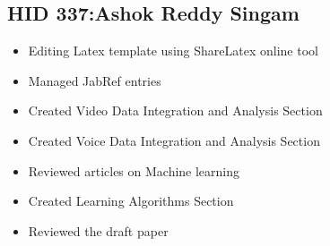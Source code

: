 \documentclass[sigconf]{acmart}
\begin{document}
\subsection{HID 337:Ashok Reddy Singam}
\begin{itemize}
  \item Editing Latex template using ShareLatex online tool
  \item Managed JabRef entries 
  \item Created Video Data Integration and Analysis Section
  \item Created Voice Data Integration and Analysis Section
  \item Reviewed articles on Machine learning 
  \item Created Learning Algorithms Section 
  \item Reviewed the draft paper 
\end{itemize}
\end{document}
